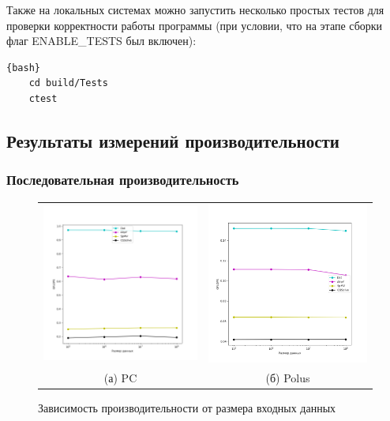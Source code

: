 \documentclass[12pt, a4paper]{article}
\begin{document}
Также на локальных системах можно запустить несколько простых тестов для проверки корректности работы программы (при условии, что на этапе сборки флаг ENABLE\_TESTS был включен):

\begin{lstlisting}{bash}
	cd build/Tests
	ctest
\end{lstlisting}


\subsection{Результаты измерений производительности}

\subsubsection{Последовательная производительность}

\begin{figure}[H]
	\center
	\begin{tabular}{cc}
		\includegraphics[width=85mm]{singlethread_pc} & \includegraphics[width=85mm]{singlethread_polus} \\
		(а) PC & (б) Polus \\[6pt]
	\end{tabular}
	\caption{Зависимость производительности от размера входных данных} 
	\label{fig:singlethread_flops}
\end{figure}
\end{document}
